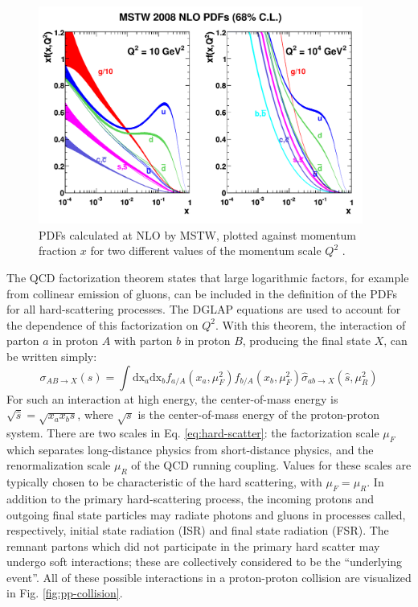 \documentclass[12pt]{thesis}  %
\begin{document}
\begin{figure}[hbt]
\begin{center}
\includegraphics[width=0.95\textwidth]{figures/mstw2008nlo68cl_allpdfs.pdf}
\caption{PDFs calculated at NLO by MSTW, plotted against momentum fraction $x$ for two different values of the momentum scale $Q^2$ \cite{MSTW09}.}
\label{fig:pdf-mstw}
\end{center}
\end{figure}

The QCD factorization theorem states that large logarithmic factors, for example from col\-lin\-ear emission of gluons, can be included in the definition of the PDFs for all hard-scattering processes. The DGLAP equations are used to account for the dependence of this factorization on $Q^2$. With this theorem, the interaction of parton $a$ in proton $A$ with parton $b$ in proton $B$, producing the final state $X$, can be written simply:
\begin{equation} \label{eq:hard-scatter}
\sigma_{AB \rightarrow X}(s) = \int{\text{dx}_{a}\text{dx}_{b} f_{a/A}(x_a,\mu_{F}^{2}) f_{b/A}(x_b,\mu_{F}^{2}) \hat{\sigma}_{ab \rightarrow X}(\hat{s},\mu_{R}^{2})}
\end{equation}
For such an interaction at high energy, the center-of-mass energy is $\sqrt{\hat{s}} = \sqrt{x_a x_b s}$, where $\sqrt{s}$ is the center-of-mass energy of the proton-proton system. There are two scales in Eq. \ref{eq:hard-scatter}: the factorization scale $\mu_{F}$ which separates long-distance physics from short-distance physics, and the renormalization scale $\mu_{R}$ of the QCD running coupling. Values for these scales are typically chosen to be characteristic of the hard scattering, with $\mu_{F} = \mu_{R}$. In addition to the primary hard-scattering process, the incoming protons and outgoing final state particles may radiate photons and gluons in processes called, respectively, initial state radiation (ISR) and final state radiation (FSR). The remnant partons which did not participate in the primary hard scatter may undergo soft interactions; these are collectively considered to be the ``underlying event''. All of these possible interactions in a proton-proton collision are visualized in Fig. \ref{fig:pp-collision}.
\end{document}
